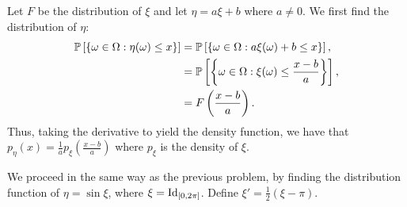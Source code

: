 \begin{problem}{10}
\end{problem}
\begin{solution}
    Let $F$ be the distribution of $\xi$ and let $\eta = a\xi + b$ where $a\neq 0$. We first find the distribution of $\eta$:
    \begin{align*}
        \mathbb{P}\left[\left\{ \omega \in \Omega: \eta(\omega) \leq x \right\}\right] &= \mathbb{P}\left[\left\{ \omega \in \Omega: a\xi(\omega) + b \leq x \right\}\right], \\
        &= \mathbb{P}\left[\left\{ \omega\in\Omega:\xi(\omega) \leq \frac{x-b}{a} \right\}\right], \\
        &= F\left(\frac{x-b}{a}\right).
    \end{align*}
    Thus, taking the derivative to yield the density function, we have that $p_\eta(x) = \frac{1}{a}p_\xi\left(\frac{x-b}{a}\right)$ where $p_\xi$ is the density of $\xi$. 
\end{solution}
\begin{problem}{11}
\end{problem}
\begin{solution}
    We proceed in the same way as the previous problem, by finding the distribution function of $\eta = \sin \xi$, where $\xi = \operatorname{Id}_{[0,2\pi]}$. Define $\xi' = \frac{1}{2}(\xi - \pi)$. 
    
\end{solution}
\begin{problem}{12}
\end{problem}
\begin{solution}
    
\end{solution}
\begin{problem}{13}
\end{problem}
\begin{solution}
    
\end{solution}
\begin{problem}{14}
\end{problem}
\begin{solution}
    
\end{solution}
\begin{problem}{15}
\end{problem}
\begin{solution}
    
\end{solution}
